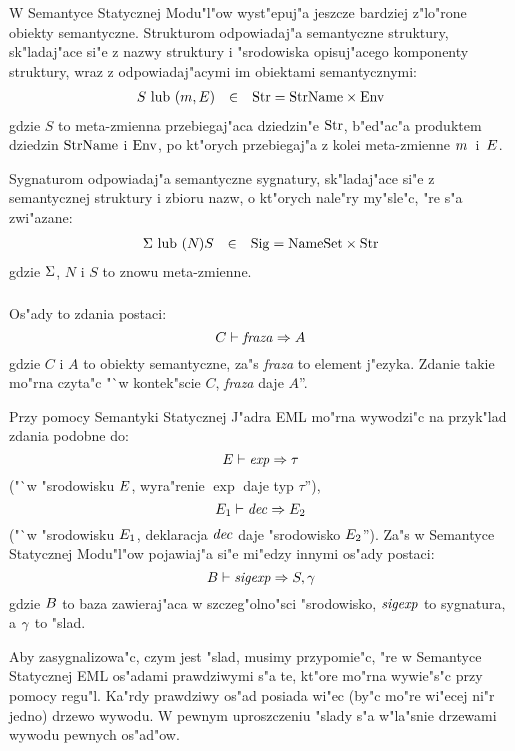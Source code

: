 W Semantyce Statycznej Modu"l"ow wyst"epuj"a jeszcze bardziej z"lo"rone
obiekty semantyczne. Strukturom odpowiadaj"a semantyczne struktury,
sk"la\-da\-j"a\-ce si"e z nazwy struktury i "srodowiska opisuj"acego
komponenty struktury, wraz z odpowiadaj"acymi im obiektami semantycznymi:
\begin{displaymath}
\begin{array}{rcl}
S\ {\rm lub}\ (m,E)
                & \in   & {\rm Str} = {\rm StrName}\times{\rm Env} \\
\end{array}
\end{displaymath}
gdzie $S$ to meta-zmienna przebiegaj"aca dziedzin"e ${\rm Str}$, 
b"ed"ac"a produktem dziedzin ${\rm StrName}$ i ${\rm Env}$, 
po kt"orych przebiegaj"a z kolei meta-zmienne $m$~i~$E$.

Sygnaturom odpowiadaj"a semantyczne sygnatury,
sk"ladaj"ace si"e z semantycznej struktury i zbioru nazw,
o kt"orych nale"ry my"sle"c, "re s"a zwi"azane:
\begin{displaymath}
\begin{array}{rcl}
\Sigma\ {\rm lub}\ (N_{})S_{}
                & \in   & {\rm Sig} =  {\rm NameSet}\times{\rm Str} \\
\end{array}
\end{displaymath}
gdzie $\Sigma$, $N$ i $S$ to znowu meta-zmienne.

\subsubsection{\secjudgments}
\label{sec:judgments}

Os"ady to zdania postaci:
\[C\vdash{\it fraza}\Rightarrow A\]
gdzie $C$ i $A$ to obiekty semantyczne, za"s {\it fraza} to element j"ezyka.
Zdanie takie mo"rna czyta"c "`w kontek"scie $C$, {\it fraza} daje $A$''.

Przy pomocy Semantyki Statycznej J"adra EML mo"rna wywodzi"c na przy\-k"lad zdania
podobne do:
$$E\vdash{\it exp}\Rightarrow\tau$$
("`w "srodowisku $E$, wyra"renie $\exp$ daje typ $\tau$''),
$$E_1\vdash{\it dec}\Rightarrow E_2$$
("`w "srodowisku $E_1$, deklaracja ${\it dec}$ daje "srodowisko $E_2$'').
Za"s w Semantyce Statycznej Modu"l"ow pojawiaj"a si"e mi"edzy innymi os"ady postaci:
$$B\vdash{\it sigexp}\Rightarrow S,\gamma$$
gdzie $B$ to baza zawieraj"aca w szczeg"olno"sci "srodowisko, ${\it sigexp}$ to sygnatura, a $\gamma$ to "slad.

Aby zasygnalizowa"c, czym jest "slad, musimy przypomie"c, 
"re w Semantyce Statycznej EML os"adami prawdziwymi s"a te, kt"ore mo"rna wywie"s"c przy pomocy regu"l.
Ka"rdy prawdziwy os"ad posiada wi"ec (by"c mo"re wi"ecej ni"r jedno) drzewo wywodu.
W pewnym uproszczeniu "slady s"a w"la"snie drzewami wywodu pewnych os"ad"ow.



